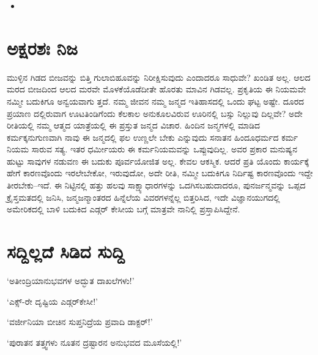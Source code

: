 \begin{itemize}
 \item {}\\
\begin{flushright}
\end{flushright}

\end{itemize}


\section{ಅಕ್ಷರಶಃ ನಿಜ}

ಮುಳ್ಳಿನ ಗಿಡದ ಬೀಜವನ್ನು ಬಿತ್ತಿ ಗುಲಾಬಿಹೂವನ್ನು ನಿರೀಕ್ಷಿಸುವುದು ಎಂದಾದರೂ ಸಾಧುವೇ? ಖಂಡಿತ ಅಲ್ಲ. ಆಲದ ಮರದ ಬೀಜದಿಂದ ಆಲದ ಮರವೇ ಮೊಳಕೆಯೊಡೆದೀತೇ ಹೊರತು ಮಾವಿನ ಗಿಡವಲ್ಲ. ಪ್ರಕೃತಿಯ ಈ ನಿಯಮವೇ ನಮ್ಮೀ ಬದುಕಿಗೂ ಅನ್ವಯವಾಗು ತ್ತದೆ. ನಮ್ಮ ಜೀವನ ನಮ್ಮ ಜನ್ಮದ ಇತಿಹಾಸದಲ್ಲಿ ಒಂದು ಘಟ್ಟ ಅಷ್ಟೇ. ದೂರದ ಪ್ರಯಾಣ ದಲ್ಲಿರುವಾಗ ಊಟತಿಂಡಿಗೆಂದು ಕೆಲಕಾಲ ಅನುಕೂಲವಿರುವ ಊರಿನಲ್ಲಿ ಬಸ್ಸು ನಿಲ್ಲುವು ದಿಲ್ಲವೇ? ಅದೇ ರೀತಿಯಲ್ಲಿ ನಮ್ಮ ಆತ್ಮದ ಯಾತ್ರೆಯಲ್ಲಿ ಈ ಪ್ರಸ್ತುತ ಜನ್ಮದ ವಿಚಾರ. ಹಿಂದಿನ ಜನ್ಮಗಳಲ್ಲಿ ಮಾಡಿದ ಕರ್ಮಕ್ಕನುಗುಣವಾಗಿ ನಾವು ಈ ಜನ್ಮದಲ್ಲಿ ಫಲ ಉಣ್ಣಲೇ ಬೇಕು ಎನ್ನುವುದು ಸನಾತನ ಹಿಂದೂಧರ್ಮದ ಕರ್ಮ ನಿಯಮ ಸಾರುವ ಸತ್ಯ. ಇತರ ಧರ್ಮೀಯರು ಈ ಕರ್ಮನಿಯಮವನ್ನು ಒಪ್ಪುವುದಿಲ್ಲ. ಅವರ ಪ್ರಕಾರ ಮನುಷ್ಯನ ಹುಟ್ಟು ಸಾವುಗಳ ನಡುವಣ ಈ ಬದುಕು ಪೂರ್ವಯೋಜಿತ ಅಲ್ಲ. ಕೇವಲ ಆಕಸ್ಮಿಕ. ಆದರೆ ಪ್ರತಿ ಯೊಂದು ಕಾರ್ಯಕ್ಕೆ ಹೇಗೆ ಕಾರಣವೊಂದು ಇರಲೇಬೇಕೋ, ಇರುವುದೋ, ಅದೇ ರೀತಿ, ನಮ್ಮೀ ಬದುಕಿಗೂ ನಿರ್ದಿಷ್ಟ ಕಾರಣವೊಂದು ಇದ್ದೇ ತೀರಬೇಕು–ಇದೆ. ಈ ನಿಟ್ಟಿನಲ್ಲಿ ಹತ್ತು ಹಲವು ಸಾಕ್ಷ್ಯಾಧಾರಗಳನ್ನು ಒದಗಿಸಬಹುದಾದರೂ, ಪುನರ್ಜನ್ಮವನ್ನು ಒಪ್ಪದ ಕ್ರೈಸ್ತಮತದಲ್ಲಿ ಜನಿಸಿ, ಜನ್ಮಜನ್ಮಾಂತರದ ಹಿನ್ನೆಲೆಯ ವಿವರಗಳನ್ನೆಲ್ಲ ಬಿತ್ತರಿಸಿದ, ಇದೇ ವಿಜ್ಞಾನಯುಗದಲ್ಲಿ ಅಮೇರಿಕದಲ್ಲಿ ಬಾಳಿ ಬದುಕಿದ ಎಡ್ಗರ್ ಕೇಸೀಯ ಬಗ್ಗೆ ಮಾತ್ರವೇ ನಾನಿಲ್ಲಿ ಪ್ರಸ್ತಾಪಿಸಿದ್ದೇನೆ.


\section{ಸದ್ದಿಲ್ಲದೆ ಸಿಡಿದ ಸುದ್ದಿ}

‘ಅತೀಂದ್ರಿಯಾನುಭವಗಳ ಅದ್ಭುತ ದಾಖಲೆಗಳು!’

‘ಎಕ್ಸ್​-ರೇ ದೃಷ್ಟಿಯ ಎಡ್ಗರ್​ಕೇಸೀ!’

‘ವರ್ಜೀನಿಯಾ ಬೀಚಿನ ಸುಪ್ತನಿದ್ರೆಯ ಪ್ರವಾದಿ ಡಾಕ್ಟರ್​!’

‘ಪುರಾತನ ತತ್ತ್ವಗಳು ನೂತನ ದ್ರಷ್ಟಾರನ ಅನುಭವದ ಮೂಸೆಯಲ್ಲಿ!’

